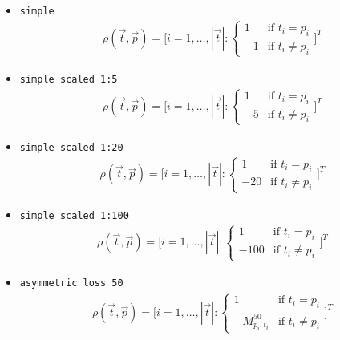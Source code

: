 \documentclass[twoside,11pt]{article}
\begin{document}
\begin{itemize}

  \item \texttt{simple}
    \begin{align*}
      \rho(\vec{t}, \vec{p}) = \Bigg[
        i=1,\dots,|\vec{t}|:
        \begin{cases}
          1  &\text{if } t_i = p_i \\
          -1 &\text{if } t_i \neq p_i
        \end{cases} \Bigg]^T
    \end{align*}

  \item \texttt{simple scaled 1:5}
    \begin{align*}
      \rho(\vec{t}, \vec{p}) = \Bigg[
        i=1,\dots,|\vec{t}|:
        \begin{cases}
          1  &\text{if } t_i = p_i \\
          -5 &\text{if } t_i \neq p_i
        \end{cases} \Bigg]^T
    \end{align*}

  \item \texttt{simple scaled 1:20}
    \begin{align*}
    \rho(\vec{t}, \vec{p}) = \Bigg[
      i=1,\dots,|\vec{t}|:
      \begin{cases}
        1  &\text{if } t_i = p_i \\
        -20 &\text{if } t_i \neq p_i
      \end{cases} \Bigg]^T
    \end{align*}

  \item \texttt{simple scaled 1:100}
    \begin{align*}
      \rho(\vec{t}, \vec{p}) = \Bigg[
      i=1,\dots,|\vec{t}|:
      \begin{cases}
        1  &\text{if } t_i = p_i \\
        -100 &\text{if } t_i \neq p_i
      \end{cases} \Bigg]^T
    \end{align*}

  \item \texttt{asymmetric loss 50}
    \begin{align*}
      \rho(\vec{t}, \vec{p}) = \Bigg[
      i=1,\dots,|\vec{t}|:
      \begin{cases}
        1  &\text{if } t_i = p_i \\
        -M^{50}_{p_i,t_i} &\text{if } t_i \neq p_i
      \end{cases} \Bigg]^T
    \end{align*}


\end{itemize}
\end{document}
